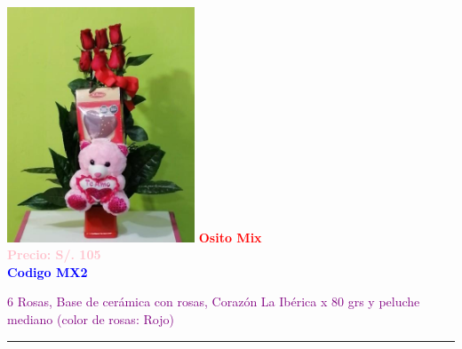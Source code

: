 \begin{multicols}{2}
    \begin{minipage}{\linewidth}
        \centering
        \includegraphics[height=7cm]{imagenes_extraidas/image_7_3} %
        \newline
        \vspace{0.1cm}
        \textbf{\Large \textcolor{red}{Osito Mix}} \\ %
        \vspace{0.2cm}
        \textbf{\textcolor{pink}{Precio: S/. 105}} \\ %
        \vspace{0.2cm}
        \textbf{\textcolor{blue}{Codigo MX2}} \\ %
        \vspace{0.2cm}
        \begin{minipage}{0.8\linewidth} 
            \small \textcolor{purple}{6 Rosas, Base de cerámica con rosas, Corazón La Ibérica x 80 grs y peluche mediano (color de rosas: Rojo)} %
        \end{minipage}
        \vspace{0.1cm}        
        \rule{\linewidth}{0.5pt}
    \end{minipage}
    

\end{multicols}
